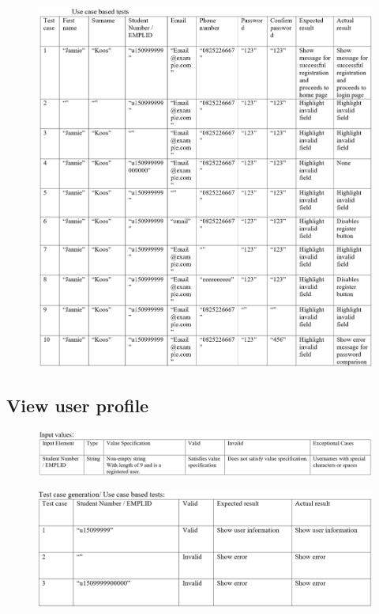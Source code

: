 \documentclass{article}
\begin{document}
\begin{figure}[H]
\hspace*{-2.5cm} 
\includegraphics[width=180mm]{7.png}
\end{figure}

\subsection{View user profile}
\begin{figure}[ht!]
\hspace*{-2.5cm} 
\includegraphics[width=180mm]{8.png}
\end{figure}

\begin{figure}[ht!]
\hspace*{-2.5cm} 
\includegraphics[width=180mm]{ViewTestCase.png}
\end{figure}
\end{document}
